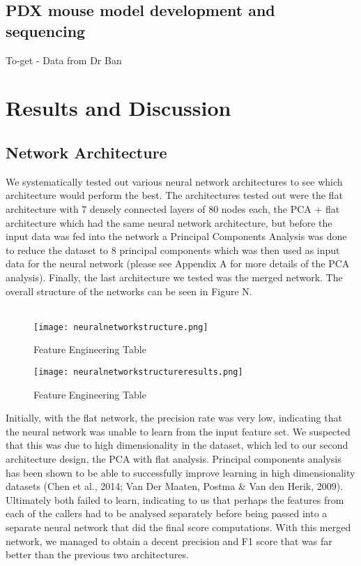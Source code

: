 \documentclass{article}
\begin{document}
\subsection{PDX mouse model development and sequencing}
To-get - Data from Dr Ban

\section{Results and Discussion}

\subsection{Network Architecture}
We systematically tested out various neural network architectures to see which architecture would perform the best. The architectures tested out were the flat architecture with 7 densely connected layers of 80 nodes each, the PCA + flat architecture which had the same neural network architecture, but before the input data was fed into the network a Principal Components Analysis was done to reduce the dataset to 8 principal components which was then used as input data for the neural network (please see Appendix A for more details of the PCA analysis). Finally, the last architecture we tested was the merged network. The overall structure of the networks can be seen in Figure N. \\\\

\begin{figure}[H]
\caption{Feature Engineering Table}
\texttt{[image: neuralnetworkstructure.png]}
\centering
\end{figure}

\begin{figure}[H]
\caption{Feature Engineering Table}
\texttt{[image: neuralnetworkstructureresults.png]}
\centering
\end{figure}
Initially, with the flat network, the precision rate was very low, indicating that the neural network was unable to learn from the input feature set. We suspected that this was due to high dimensionality in the dataset, which led to our second architecture design, the PCA with flat analysis. Principal components analysis has been shown to be able to successfully improve learning in high dimensionality datasets (Chen et al., 2014; Van Der Maaten, Postma \& Van den Herik, 2009). Ultimately both failed to learn, indicating to us that perhaps the features from each of the callers had to be analysed separately before being passed into a separate neural network that did the final score computations. With this merged network, we managed to obtain a decent precision and F1 score that was far better than the previous two architectures. 
\end{document}
